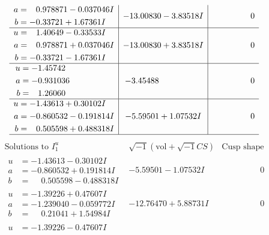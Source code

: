 \documentclass[1p]{elsarticle_modified}
\theoremstyle{definition}
\newcommand{\I}{\sqrt{-1}}
\begin{document}
$$\begin{array}{c|c|c}
\begin{aligned}
a &= \phantom{-}0.978871 - 0.037046 I \\
b &= -0.33721 + 1.67361 I\end{aligned}
 & -13.00830 - 3.83518 I & \phantom{-0.000000 } 0 \\ \hline\begin{aligned}
u &= \phantom{-}1.40649 - 0.33533 I \\
a &= \phantom{-}0.978871 + 0.037046 I \\
b &= -0.33721 - 1.67361 I\end{aligned}
 & -13.00830 + 3.83518 I & \phantom{-0.000000 } 0 \\ \hline\begin{aligned}
u &= -1.45742\phantom{ +0.000000I} \\
a &= -0.931036\phantom{ +0.000000I} \\
b &= \phantom{-}1.26060\phantom{ +0.000000I}\end{aligned}
 & -3.45488\phantom{ +0.000000I} & \phantom{-0.000000 } 0 \\ \hline\begin{aligned}
u &= -1.43613 + 0.30102 I \\
a &= -0.860532 - 0.191814 I \\
b &= \phantom{-}0.505598 + 0.488318 I\end{aligned}
 & -5.59501 + 1.07532 I & \phantom{-0.000000 } 0\\
 \hline 
 \end{array}$$\newpage$$\begin{array}{c|c|c}  
\text{Solutions to }I^u_{1}& \I (\text{vol} + \sqrt{-1}CS) & \text{Cusp shape}\\
 \hline 
\begin{aligned}
u &= -1.43613 - 0.30102 I \\
a &= -0.860532 + 0.191814 I \\
b &= \phantom{-}0.505598 - 0.488318 I\end{aligned}
 & -5.59501 - 1.07532 I & \phantom{-0.000000 } 0 \\ \hline\begin{aligned}
u &= -1.39226 + 0.47607 I \\
a &= -1.239040 - 0.059772 I \\
b &= \phantom{-}0.21041 + 1.54984 I\end{aligned}
 & -12.76470 + 5.88731 I & \phantom{-0.000000 } 0 \\ \hline\begin{aligned}
u &= -1.39226 - 0.47607 I \\

\end{aligned}
\end{array}$$
\end{document}
